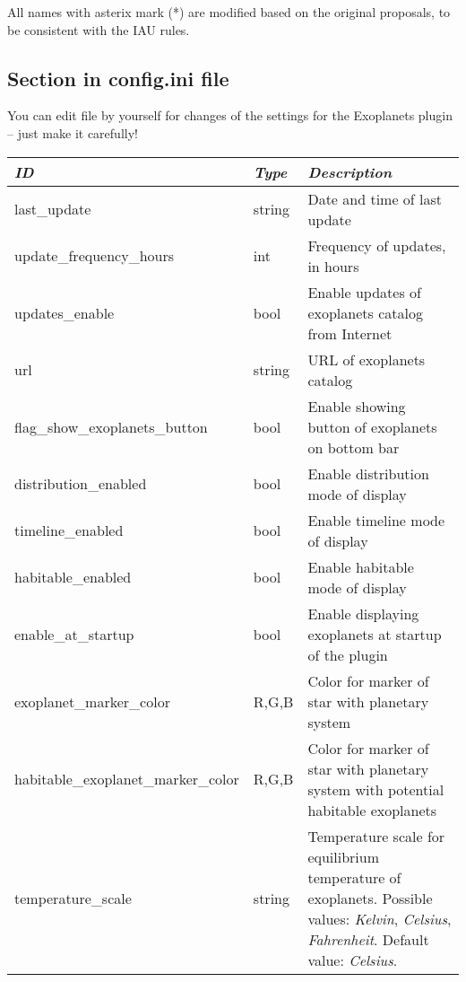 All names with asterix mark (*) are modified based on the original proposals, to be consistent with the IAU rules.

\subsection{Section  in config.ini file}

You can edit  file by yourself for changes of the
settings for the Exoplanets plugin -- just make it carefully!

\noindent%
\begin{longtable}{l|l|p{75mm}}\toprule
\emph{ID}               & \emph{Type} & \emph{Description}\\\midrule
last\_update                 & string & Date and time of last update \\
update\_frequency\_hours       & int  & Frequency of updates, in hours \\
updates\_enable                & bool & Enable updates of exoplanets catalog from Internet \\
url                          & string & URL of exoplanets catalog \\
flag\_show\_exoplanets\_button & bool & Enable showing button of exoplanets on bottom bar \\
distribution\_enabled          & bool & Enable distribution mode of display \\
timeline\_enabled              & bool & Enable timeline mode of display \\
habitable\_enabled             & bool & Enable habitable mode of display \\
enable\_at\_startup            & bool & Enable displaying exoplanets at startup of the plugin \\
exoplanet\_marker\_color      & R,G,B & Color for marker of star with planetary system \\
habitable\_exoplanet\_marker\_color & R,G,B & Color for marker of star with planetary system with potential habitable exoplanets\\
temperature\_scale           & string & Temperature scale for equilibrium temperature of exoplanets. 
                                        Possible values: \emph{Kelvin}, \emph{Celsius}, \emph{Fahrenheit}. Default value: \emph{Celsius}. \\\bottomrule
\end{longtable}

